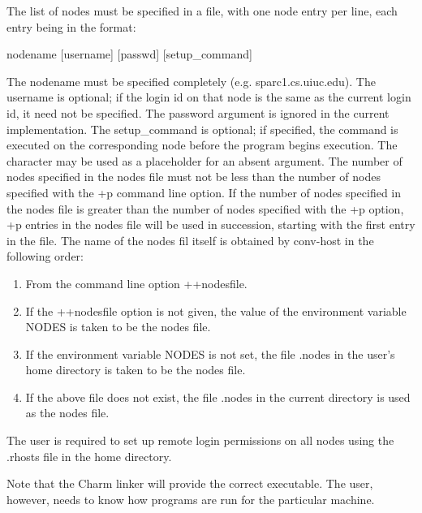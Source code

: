 \begin{itemize}
The list of nodes must be specified in a file, with one node entry per
line, each entry being in the format:

{\fexec nodename [username] [passwd] [setup\_command]}

The {\fparm nodename} must be specified completely (e.g. sparc1.cs.uiuc.edu).
The {\fparm username} is optional; if the login id on that node is the
same as the current login id, it need not be specified.
The {\fparm password} argument is ignored in the current implementation.
The {\fparm setup\_command} is optional; if specified,
the command is executed on the corresponding node before the program 
begins execution. The {\bf *} character may be used as a
placeholder for an absent argument.
The number of nodes specified in the nodes file must not be less
than the number of nodes specified with the {\fexec +p} command
line option. If the number of nodes specified in the nodes file is
greater than the number of nodes specified with the {\fexec +p} option,
{\fexec +p} entries in the nodes file will be used in succession, starting
with the first entry in the file.
The name of the nodes fil itself is
obtained by  {\fexec conv-host} in the following order:
\begin{enumerate}

\item	From the command line option {\fexec ++nodesfile}.

\item	If the {\fexec ++nodesfile} option is not given, the value of the 
environment variable {\fexec NODES} is taken to be the nodes file.

\item	If the environment variable {\fexec NODES} is not set, the file 
{\fparm .nodes} in the user's home
directory is taken to be the nodes file.

\item	If the above file does not exist, the file 
{\fparm .nodes} in the current
directory is used as the nodes file.

\end{enumerate}

The user is required to set up remote login permissions on all nodes
using the .rhosts file in the home directory.

\end{itemize}

Note that the Charm linker will provide the correct 
executable. The user, however, needs to know how programs are run for
the particular machine.


